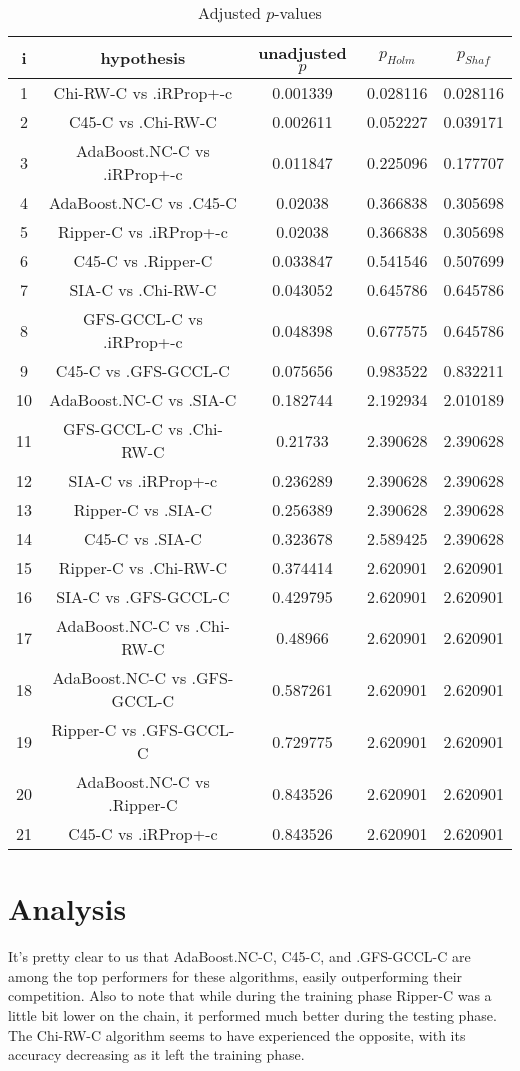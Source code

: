 \documentclass[a4paper,10pt]{article}
\begin{document}
\begin{table}[!htp]
\scriptsize\centering
\caption{Adjusted $p$-values}
\begin{tabular}{ccccc}
i&hypothesis&unadjusted $p$&$p_{Holm}$&$p_{Shaf}$\\
\hline1&Chi-RW-C vs .iRProp+-c&0.001339&0.028116&0.028116\\
2&C45-C vs .Chi-RW-C&0.002611&0.052227&0.039171\\
3&AdaBoost.NC-C vs .iRProp+-c&0.011847&0.225096&0.177707\\
4&AdaBoost.NC-C vs .C45-C&0.02038&0.366838&0.305698\\
5&Ripper-C vs .iRProp+-c&0.02038&0.366838&0.305698\\
6&C45-C vs .Ripper-C&0.033847&0.541546&0.507699\\
7&SIA-C vs .Chi-RW-C&0.043052&0.645786&0.645786\\
8&GFS-GCCL-C vs .iRProp+-c&0.048398&0.677575&0.645786\\
9&C45-C vs .GFS-GCCL-C&0.075656&0.983522&0.832211\\
10&AdaBoost.NC-C vs .SIA-C&0.182744&2.192934&2.010189\\
11&GFS-GCCL-C vs .Chi-RW-C&0.21733&2.390628&2.390628\\
12&SIA-C vs .iRProp+-c&0.236289&2.390628&2.390628\\
13&Ripper-C vs .SIA-C&0.256389&2.390628&2.390628\\
14&C45-C vs .SIA-C&0.323678&2.589425&2.390628\\
15&Ripper-C vs .Chi-RW-C&0.374414&2.620901&2.620901\\
16&SIA-C vs .GFS-GCCL-C&0.429795&2.620901&2.620901\\
17&AdaBoost.NC-C vs .Chi-RW-C&0.48966&2.620901&2.620901\\
18&AdaBoost.NC-C vs .GFS-GCCL-C&0.587261&2.620901&2.620901\\
19&Ripper-C vs .GFS-GCCL-C&0.729775&2.620901&2.620901\\
20&AdaBoost.NC-C vs .Ripper-C&0.843526&2.620901&2.620901\\
21&C45-C vs .iRProp+-c&0.843526&2.620901&2.620901\\
\hline
\end{tabular}
\end{table}
\flushleft

\section {Analysis}
It's pretty clear to us that AdaBoost.NC-C, C45-C, and .GFS-GCCL-C are among the top performers for these algorithms, easily outperforming their competition. Also to note that while during the training phase Ripper-C was a little bit lower on the chain, it performed much better during the testing phase. The Chi-RW-C algorithm seems to have experienced the opposite, with its accuracy decreasing as it left the training phase.

\end{document}
